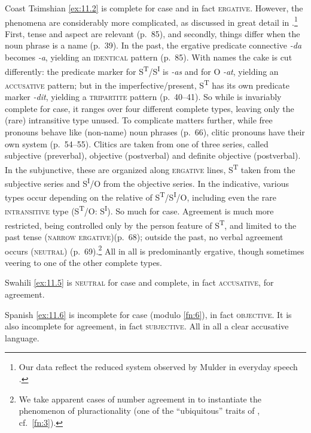 \documentclass[output=paper]{langsci/langscibook}
\begin{document}
Coast Tsimshian \eqref{ex:11.2} is complete for case and in fact
\textsc{ergative}.  However, the phenomena are considerably more complicated,
as discussed in great detail in \citet{Mulder1994}.\footnote{Our data reflect
    the reduced system observed by Mulder in everyday speech
\citep[39]{Mulder1994}.} First, tense and aspect are relevant (p.\ 85), and
secondly, things differ when the noun phrase is a name (p.\ 39). In the past,
the ergative predicate connective \emph{-da} becomes \emph{-a}, yielding an
\textsc{identical} pattern (p.\ 85). With names the cake is cut differently:
the predicate marker for S\textsuperscript{T}/S\textsuperscript{I} is
\emph{-as} and for O \emph{-at}, yielding an \textsc{accusative} pattern; but
in the imperfective/present, S\textsuperscript{T} has its own predicate marker
\emph{-dit}, yielding a \textsc{tripartite} pattern (p.\ 40--41). So while
 is invariably complete for case, it ranges over four
different complete types, leaving only the (rare) intransitive type unused. To
complicate matters further, while free pronouns behave like (non-name) noun
phrases (p.\ 66), clitic pronouns have their own system (p.\ 54--55). Clitics
are taken from one of three series, called subjective (preverbal), objective
(postverbal) and definite objective (postverbal). In the subjunctive, these are
organized along \textsc{ergative} lines, S\textsuperscript{T} taken from the
subjective series and S\textsuperscript{I}/O from the objective series. In the
indicative, various types occur depending on the relative  of
S\textsuperscript{T}/S\textsuperscript{I}/O, including even the rare
\textsc{intransitive} type (S\textsuperscript{T}/O: S\textsuperscript{I}). So
much for  case. Agreement is much more restricted, being
controlled only by the person feature of S\textsuperscript{T}, and limited to
the past tense (\textsc{narrow ergative})(p.\ 68); outside the past, no verbal
agreement occurs (\textsc{neutral}) (p.\ 69).\footnote{We take apparent cases of
    number agreement in  to instantiate the phenomenon of
pluractionality (one of the \enquote{ubiquitous}  traits of
\citealt{Queixalos2013}, cf.\ \cref{fn:3}).} All in all 
is predominantly ergative, though sometimes veering to one of the other
complete types.

Swahili \eqref{ex:11.5} is \textsc{neutral} for case and complete, in fact
\textsc{accusative}, for agreement.

Spanish \eqref{ex:11.6} is incomplete for case (modulo \cref{fn:6}), in fact \textsc{objective}.
It is also incomplete for agreement, in fact \textsc{subjective}. All in all a
clear accusative language.
\end{document}
